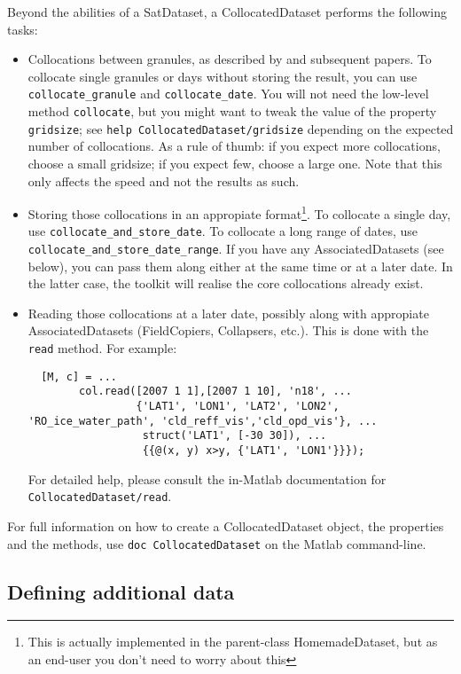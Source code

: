 \documentclass[a4paper,10pt]{article}
\begin{document}
Beyond the abilities of a SatDataset, a CollocatedDataset performs the
following tasks:
\begin{itemize}
\item Collocations between granules, as described by
\citet{holl10:_collocating_amt} and subsequent papers.
To collocate single granules or days without storing the result, you can
use \lstinline|collocate_granule| and \lstinline|collocate_date|.
You will not need the low-level method \lstinline|collocate|, but you
might want to tweak the value of the property \lstinline|gridsize|; see
\lstinline|help CollocatedDataset/gridsize| depending on the expected
number of collocations. As a rule of thumb: if you expect more collocations,
choose a small gridsize; if you expect few, choose a large one.
Note that this only affects the speed and not the results as such.
\item Storing those collocations in an appropiate format\footnote{This is
actually implemented in the parent-class HomemadeDataset, but as an end-user
you don't need to worry about this}.
To collocate a single day, use \lstinline|collocate_and_store_date|.
To collocate a long range of dates, use
\lstinline|collocate_and_store_date_range|.
If you have any AssociatedDatasets (see below), you can pass them along
either at the same time or at a later date.
In the latter case, the toolkit will realise the core collocations already
exist.
\item Reading those collocations at a later date, possibly along with
appropiate AssociatedDatasets (FieldCopiers, Collapsers, etc.).
This is done with the \lstinline|read| method. 
For example:
\begin{lstlisting}
  [M, c] = ...
        col.read([2007 1 1],[2007 1 10], 'n18', ...
                 {'LAT1', 'LON1', 'LAT2', 'LON2', 'RO_ice_water_path', 'cld_reff_vis','cld_opd_vis'}, ...
                  struct('LAT1', [-30 30]), ...
                  {{@(x, y) x>y, {'LAT1', 'LON1'}}});
\end{lstlisting}
For detailed help, please consult the in-Matlab documentation for
\lstinline|CollocatedDataset/read|.
\end{itemize}

For full information on how to create a CollocatedDataset object, the
properties and the methods, use \lstinline|doc CollocatedDataset| on the
Matlab command-line.

\subsection{Defining additional data}
\end{document}
